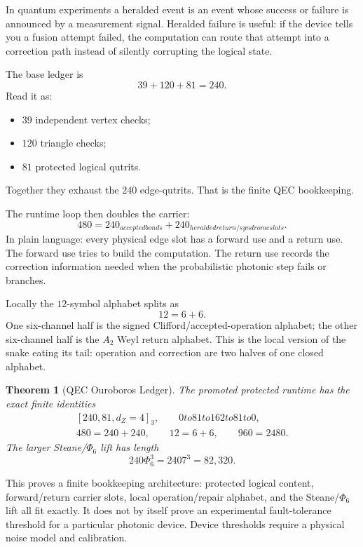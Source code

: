 \documentclass[11pt]{article}
\def\textbf#1{#1}%
\def\text#1{#1}%
\def\Phi#1{Phi#1}%
\def\cdot{ }%
\def\to{ to }%
\newtheorem*{theorem}{Theorem}
\begin{document}
\begin{mathnote}
In quantum experiments a \textbf{heralded} event is an event whose success or failure is announced by a measurement signal. Heralded failure is useful: if the device tells you a fusion attempt failed, the computation can route that attempt into a correction path instead of silently corrupting the logical state.
\end{mathnote}

The base ledger is
\[
39 + 120 + 81 = 240.
\]
Read it as:
\begin{itemize}[leftmargin=2em]
\item $39$ independent vertex checks;
\item $120$ triangle checks;
\item $81$ protected logical qutrits.
\end{itemize}
Together they exhaust the $240$ edge-qutrits. That is the finite QEC bookkeeping.

The runtime loop then doubles the carrier:
\[
480 = 240_{\text{accepted bonds}} + 240_{\text{heralded return/syndrome slots}}.
\]
In plain language: every physical edge slot has a forward use and a return use. The forward use tries to build the computation. The return use records the correction information needed when the probabilistic photonic step fails or branches.

Locally the $12$-symbol alphabet splits as
\[
12 = 6 + 6.
\]
One six-channel half is the signed Clifford/accepted-operation alphabet; the other six-channel half is the $A_2$ Weyl return alphabet. This is the local version of the snake eating its tail: operation and correction are two halves of one closed alphabet.

\begin{theorem}[QEC Ouroboros Ledger]
The promoted protected runtime has the exact finite identities
\[
\begin{gathered}
[240,81,d_Z=4]_3,\qquad 0\to81\to162\to81\to0,\\
480=240+240,\qquad 12=6+6,\qquad 960=2\cdot480.
\end{gathered}
\]
The larger Steane/$\Phi_6$ lift has length
\[
240\cdot\Phi_6^3 = 240\cdot7^3 = 82{,}320.
\]
\end{theorem}

\begin{statusbox}[title=What this does and does not prove]
This proves a finite bookkeeping architecture: protected logical content, forward/return carrier slots, local operation/repair alphabet, and the Steane/$\Phi_6$ lift all fit exactly. It does not by itself prove an experimental fault-tolerance threshold for a particular photonic device. Device thresholds require a physical noise model and calibration.
\end{statusbox}
\end{document}
